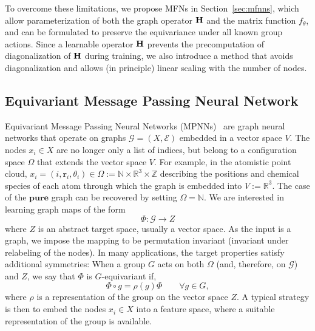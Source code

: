 \documentclass{article} \usepackage{iclr2024_conference,times}
\newcommand{\R}{\mathbb{R}}
\def\N{\mathbb{N}}
\def\R{\mathbb{R}}
\def\Z{\mathbb{Z}}
\begin{document}
To overcome these limitations, we propose MFNs in Section~\ref{sec:mfnns}, 
which allow parameterization of both the graph operator ${\bf H}$ and the matrix function $f_\theta$, and can be formulated to preserve the equivariance under all known group actions. Since a learnable operator ${\bf H}$ prevents the precomputation of diagonalization of ${\bf H}$ during training, we also introduce a method that avoids diagonalization and allows (in principle) linear scaling with the number of nodes.  

\subsection{Equivariant Message Passing Neural Network}
\label{sec:mpnn}
Equivariant Message Passing Neural Networks (MPNNs)~\cite{nequip, Batatia2022mace} are graph neural networks that operate on graphs $\mathcal{G} = (X, \mathcal{E})$ embedded in a vector space $V$. 
The nodes $x_i \in X$ are no longer only a list of indices, but belong to a configuration space $\Omega$ that extends the vector space $V$.
For example, in the atomistic point cloud, $x_{i} = (i, {\bm r}_{i}, \theta_{i}) \in \Omega := \N \times\R^{3} \times \Z$ describing the positions and chemical species of each atom through which the graph is embedded into $V := \mathbb{R}^3$. 
The case of the $\textbf{pure}$ graph can be recovered by setting $\Omega = \N$. 
We are interested in learning graph maps of the form
\begin{equation}
    \Phi \colon \mathcal{G} \to Z
\end{equation}
where $Z$ is an abstract target space, usually a vector space. As the input is a graph, we impose the mapping to be permutation invariant (invariant under relabeling of the nodes). In many applications, the target properties satisfy additional symmetries: When a group $G$ acts on both $\Omega$ (and, therefore, on $\mathcal{G}$) and $Z$, we say that $\Phi$ is $G$-equivariant if,
\begin{equation}
    \Phi \circ g = \rho(g) \Phi \qquad \forall g \in G, 
\end{equation}
where $\rho$ is a representation of the group on the vector space $Z$. A typical strategy is then to embed the nodes $x_i \in X$ into a feature space, where a suitable representation of the group is available.
\end{document}
